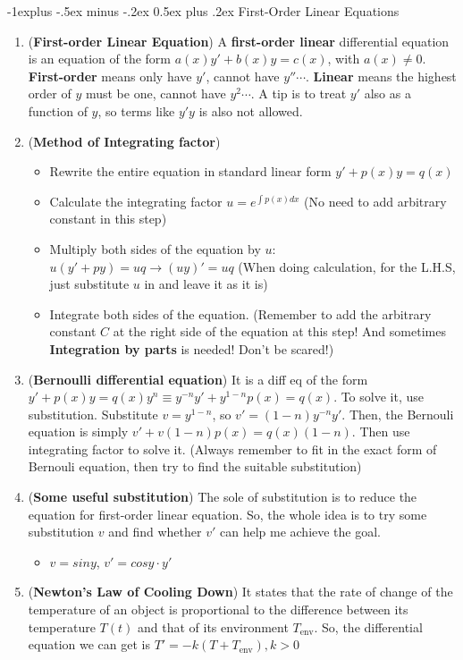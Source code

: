 \documentclass[10pt, landscape]{article}
\makeatletter
\renewcommand{\subsection}{\@startsection{subsection}{2}{0mm}%
                                {-1explus -.5ex minus -.2ex}%
                                {0.5ex plus .2ex}%
                                {\normalfont\normalsize\bfseries}}
\makeatother
\begin{document}
\begin{multicols}{4}
\subsection{First-Order Linear Equations}
\begin{enumerate}
    \item (\textbf{First-order Linear Equation}) A \textbf{first-order linear} differential equation is an equation of the form $a(x)y'+b(x)y=c(x)$, with $a(x)\neq 0$. \textbf{First-order} means only have $y'$, cannot have $y'' \cdots$. \textbf{Linear} means the highest order of $y$ must be one, cannot have $y^2 \cdots$. A tip is to treat $y'$ also as a function of $y$, so terms like $y'y$ is also not allowed.
    \item (\textbf{Method of Integrating factor})
    \begin{itemize}
        \item Rewrite the entire equation in standard linear form $y'+p(x)y=q(x)$
        \item Calculate the integrating factor $u=e^{\int p(x)dx}$ (No need to add arbitrary constant in this step)
        \item Multiply both sides of the equation by $u$: $u(y'+py)=uq\rightarrow (uy)'=uq$ (When doing calculation, for the L.H.S, just substitute $u$ in and leave it as it is)
        \item Integrate both sides of the equation. (Remember to add the arbitrary constant $C$ at the right side of the equation at this step! And sometimes \textbf{Integration by parts} is needed! Don't be scared!)
    \end{itemize}
    \item (\textbf{Bernoulli differential equation}) It is a diff eq of the form $y'+p(x)y=q(x)y^n\equiv y^{-n}y'+y^{1-n}p(x)=q(x)$. To solve it, use substitution. Substitute $v=y^{1-n}$, so $v'=(1-n)y^{-n}y'$. Then, the Bernouli equation is simply $v'+v(1-n)p(x)=q(x)(1-n)$. Then use integrating factor to solve it. (Always remember to fit in the exact form of Bernouli equation, then try to find the suitable substitution)
    \item (\textbf{Some useful substitution}) The sole of substitution is to reduce the equation for first-order linear equation. So, the whole idea is to try some substitution $v$ and find whether $v'$ can help me achieve the goal.
    \begin{itemize}
        \item $v=siny$, $v'=cosy\cdot y'$
    \end{itemize}
    \item (\textbf{Newton's Law of Cooling Down}) It states that the rate of change of the temperature of an object is proportional to the difference between its temperature $T(t)$ and that of its environment $T_{\text{env}}$. So, the differential equation we can get is $T'=-k(T+T_{\text{env}}),k>0$
\end{enumerate}

\end{multicols}
\end{document}
